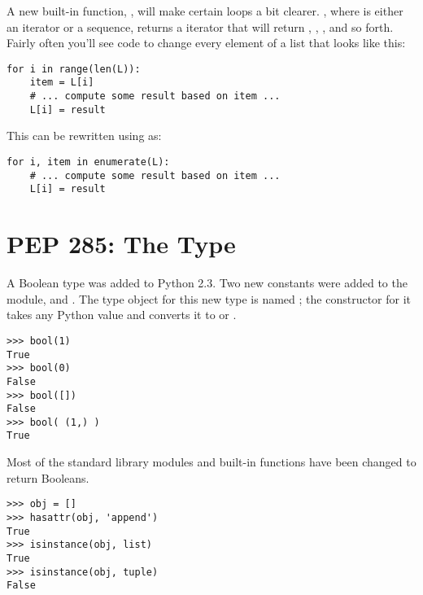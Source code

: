 \documentclass{howto}
\begin{document}
A new built-in function, , will make
certain loops a bit clearer.  , where
 is either an iterator or a sequence, returns a iterator
that will return , , , and so forth.  Fairly
often you'll see code to change every element of a list that looks
like this:

\begin{verbatim}
for i in range(len(L)):
    item = L[i]
    # ... compute some result based on item ...
    L[i] = result
\end{verbatim}

This can be rewritten using  as:

\begin{verbatim}
for i, item in enumerate(L):
    # ... compute some result based on item ...
    L[i] = result
\end{verbatim}


\begin{seealso}


\end{seealso}


\section{PEP 285: The  Type\label{section-bool}}

A Boolean type was added to Python 2.3.  Two new constants were added
to the  module,  and
.  The type object for this new type is named
; the constructor for it takes any Python value and
converts it to  or .

\begin{verbatim}
>>> bool(1)
True
>>> bool(0)
False
>>> bool([])
False
>>> bool( (1,) )
True
\end{verbatim}

Most of the standard library modules and built-in functions have been
changed to return Booleans.

\begin{verbatim}
>>> obj = []
>>> hasattr(obj, 'append')
True
>>> isinstance(obj, list)
True
>>> isinstance(obj, tuple)
False
\end{verbatim}
\end{document}

